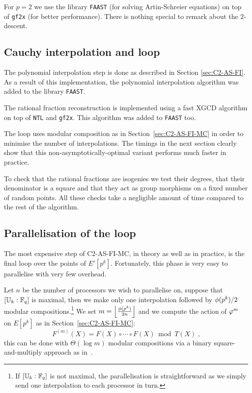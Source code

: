 For $p=2$ we use the library \texttt{FAAST} (for solving
Artin-Schreier equations) on top of \texttt{gf2x} (for better
performance). There is nothing special to remark about the
$2$-descent.


\subsection{Cauchy interpolation and loop}
\label{sec:impl:cauchy}
The polynomial interpolation step is done as described in Section
\ref{sec:C2-AS-FI}. As a result of this implementation, the polynomial
interpolation algorithm was added to the library \texttt{FAAST}.

The rational fraction reconstruction is implemented using a fast XGCD
algorithm on top of \texttt{NTL} and \texttt{gf2x}. This algorithm was
added to \texttt{FAAST} too.

The loop uses modular composition as in Section~\ref{sec:C2-AS-FI-MC}
in order to minimise the number of interpolations. The timings in the
next section clearly show that this non-asymptotically-optimal variant
performs much faster in practice.

To check that the rational fractions are isogenies we test their
degrees, that their denominator is a square and that they act as group
morphisms on a fixed number of random points. All these checks take a
negligible amount of time compared to the rest of the algorithm.


\subsection{Parallelisation of the loop}
\label{parallel}

The most expensive step of C2-AS-FI-MC, in theory as well as in
practice, is the final loop over the points of $E'[p^k]$. Fortunately,
this phase is very easy to parallelise with very few overhead.

Let $n$ be the number of processors we wish to parallelise on, suppose
that $[\mathbb{U}_k:\mathbb{F}_q]$ is maximal, then we make only one interpolation
followed by $\phi(p^k)/2$ modular compositions.\footnote{If
  $[\mathbb{U}_k:\mathbb{F}_q]$ is not maximal, the parallelisation is straightforward
  as we simply send one interpolation to each processor in turn.} We
set $m=\left\lfloor\frac{\phi(p^k)}{2n}\right\rfloor$ and we compute
the action of $\varphi^{m}$ on $E[p^k]$ as in
Section~\ref{sec:C2-AS-FI-MC}:
\begin{equation*}
  F^{(m)}(X) = F(X) \circ \cdots \circ F(X) \bmod T(X)
  \;\text{,}
\end{equation*}
this can be done with $\Theta(\log m)$ modular compositions via a
binary square-and-multiply approach as in~\cite[Algorithm
5.2]{vzGS92}.

